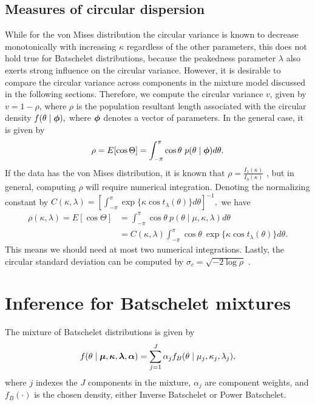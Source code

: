 \subsection{Measures of circular dispersion}
\label{sub:csd}

While for the von Mises distribution the circular variance is known to decrease monotonically with increasing \(\kappa\) regardless of the other parameters, this does not hold true for Batschelet distributions, because the peakedness parameter \(\lambda\) also exerts strong influence on the circular variance. However, it is desirable to compare the circular variance across components in the mixture model discussed in the following sections. Therefore, we compute the circular variance $v$, given by \(v = 1 - \rho\), where \(\rho\) is the population resultant length associated with the circular density \(f(\theta \mid \boldsymbol{\phi}),\)  where \(\boldsymbol{\phi}\) denotes a vector of parameters. In the general case, it is given by
\begin{equation}
  \rho = E[\cos\Theta] = \int_{-\pi}^\pi \cos\theta ~ p(\theta \mid \boldsymbol{\phi}) d\theta.
\end{equation}
If the data has the von Mises distribution, it is known that \(\rho =  \frac{I_1(\kappa)}{I_0(\kappa)}\) \citep{mardia2009directional}, but in general, computing \(\rho\) will require numerical integration. Denoting the normalizing constant by \(C(\kappa, \lambda) = \left[\int_{-\pi}^\pi \exp\{\kappa \cos t_\lambda(\theta) \} d\theta \right]^{-1} ,\) we have
\begin{align}
\rho(\kappa, \lambda) = E[\cos\Theta] &= \int_{-\pi}^\pi \cos\theta ~ p(\theta \mid \mu, \kappa, \lambda) d\theta  \\
&= C(\kappa, \lambda) \int_{-\pi}^\pi \cos\theta ~  \exp\{\kappa \cos t_\lambda(\theta) \} d\theta.
\end{align}
This means we should need at most two numerical integrations. Lastly, the circular standard deviation can be computed by \(\sigma_c = \sqrt{-2\log\rho}\) \citep{fisher1995statistical}.


\section{Inference for Batschelet mixtures}
\label{sec:infer}

The mixture of Batschelet distributions is given by
\begin{equation}
 f(\theta \mid \boldsymbol{\mu}, \boldsymbol{\kappa}, \boldsymbol{\lambda}, \boldsymbol{\alpha}) = \sum_{j = 1}^J\alpha_j f_B(\theta \mid \mu_j, \kappa_j, \lambda_j),
\end{equation}
where \(j\) indexes the \(J\) components in the mixture, $\alpha_j$ are component weights, and \(f_B(\cdot)\) is the chosen density, either Inverse Batschelet or Power Batschelet.


